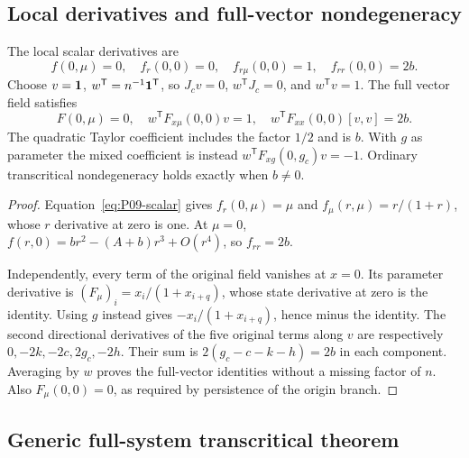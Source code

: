 \subsection{Local derivatives and full-vector nondegeneracy}

\begin{proposition}
\label{prop:P09-coefficients}
The local scalar derivatives are
\begin{equation}
 f(0,\mu)=0,\quad f_r(0,0)=0,\quad
 f_{r\mu}(0,0)=1,\quad f_{rr}(0,0)=2b.
 \label{eq:P09-scalar-coefficients}
\end{equation}
Choose $v=\mathbf{1}$, $w^{\mathsf T}=n^{-1}\mathbf{1}^{\mathsf T}$, so
$J_cv=0$, $w^{\mathsf T}J_c=0$, and $w^{\mathsf T}v=1$.
The full vector field satisfies
\begin{equation}
 F(0,\mu)=0,\quad w^{\mathsf T}F_{x\mu}(0,0)v=1,\quad
 w^{\mathsf T}F_{xx}(0,0)[v,v]=2b.
 \label{eq:P09-full-coefficients}
\end{equation}
The quadratic Taylor coefficient includes the factor $1/2$ and is $b$.
With $g$ as parameter the mixed coefficient is instead
$w^{\mathsf T}F_{xg}(0,g_c)v=-1$. Ordinary transcritical
nondegeneracy holds exactly when $b\ne0$.
\end{proposition}
\begin{proof}
Equation~\eqref{eq:P09-scalar} gives $f_r(0,\mu)=\mu$ and
$f_\mu(r,\mu)=r/(1+r)$, whose $r$ derivative at zero is one.
At $\mu=0$, $f(r,0)=br^2-(A+b)r^3+O(r^4)$, so $f_{rr}=2b$.

Independently, every term of the original field vanishes at $x=0$.
Its parameter derivative is $(F_\mu)_i=x_i/(1+x_{i+q})$,
whose state derivative at zero is the identity. Using $g$ instead
gives $-x_i/(1+x_{i+q})$, hence minus the identity.
The second directional derivatives of the five original terms along $v$
are respectively $0,-2k,-2c,2g_c,-2h$. Their sum is
$2(g_c-c-k-h)=2b$ in each component. Averaging by $w$ proves the
full-vector identities without a missing factor of $n$. Also
$F_\mu(0,0)=0$, as required by persistence of the origin branch.
\end{proof}

\subsection{Generic full-system transcritical theorem}
\label{slot:P09-2}

